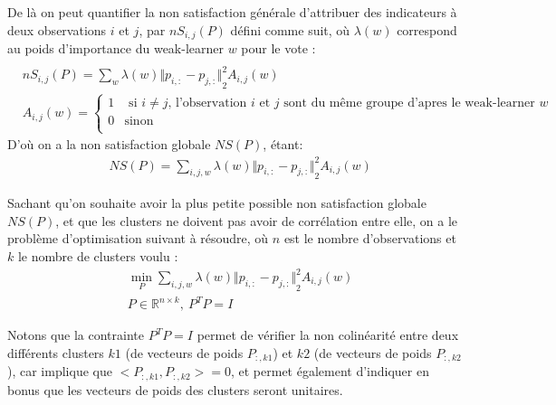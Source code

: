 \documentclass[12pt, french, latin.medieval, a4paper]{report}
\begin{document}
   	 De là on peut quantifier la non satisfaction générale d'attribuer des indicateurs à deux observations $i$ et $j$, par $nS_{i,j}(P)$ défini comme suit, où $\lambda(w)$ correspond au poids d’importance du weak-learner $w$ pour le vote :
   	 \begin{equation}
   		 \begin{aligned}
   			\\ & nS_{i,j}(P) = \sum_{w} \lambda(w) {\Vert p_{i,:} - p_{j,:} \Vert}_2^2 A_{i,j}(w)
            \\ & A_{i,j}(w) = \begin{cases}
                    1 & \text{ si $i \neq j$, l'observation $i$ et $j$ sont du même groupe d'apres le weak-learner $w$}  \\
                    0 & \text{sinon} \\
                \end{cases}
   		 \end{aligned}
   	 \end{equation}
   	 D’où on a la non satisfaction globale $NS(P)$, étant:
   	 \begin{equation}
   		 \begin{aligned}
   			 & NS(P) = \sum_{i,j,w} \lambda(w) {\Vert p_{i,:} - p_{j,:} \Vert}_2^2 A_{i,j}(w)
   		 \end{aligned}
   	 \end{equation}

   	 Sachant qu'on souhaite avoir la plus petite possible non satisfaction globale $NS(P)$, et que les clusters ne doivent pas avoir de corrélation entre elle, on a le problème d'optimisation suivant à résoudre, où $n$ est le nombre d’observations et $k$ le nombre de clusters voulu :
   	 \begin{equation}
   		 \begin{aligned}
   			 & \min_{P} \sum_{i,j,w} \lambda(w) {\Vert p_{i,:} - p_{j,:} \Vert}_2^2 A_{i,j}(w)
   			 \\ & P \in \mathbb{R}^{n \times k} ,\ P^TP = I
   		 \end{aligned}
   	 \end{equation}
     
   	 Notons que la contrainte $P^TP = I$ permet de vérifier la non colinéarité entre deux différents clusters $k1$ (de vecteurs de poids $P_{:,k1}$) et $k2$ (de vecteurs de poids $P_{:,k2}$), car implique que $<P_{:,k1}, P_{:,k2}>=0$,
   	 et permet également d'indiquer en bonus que les vecteurs de poids des clusters seront unitaires.
   	 
\end{document}

